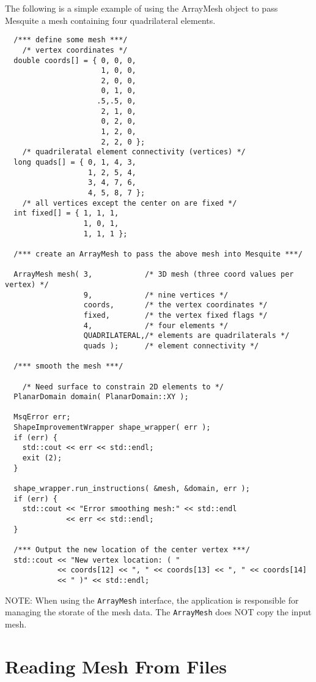 The following is a simple example of using the ArrayMesh object to pass
Mesquite a mesh containing four quadrilateral elements.
\begin{verbatim}
  /*** define some mesh ***/
    /* vertex coordinates */
  double coords[] = { 0, 0, 0,
                      1, 0, 0,
                      2, 0, 0,
                      0, 1, 0,
                     .5,.5, 0,
                      2, 1, 0,
                      0, 2, 0,
                      1, 2, 0,
                      2, 2, 0 };
    /* quadrileratal element connectivity (vertices) */
  long quads[] = { 0, 1, 4, 3,
                   1, 2, 5, 4,
                   3, 4, 7, 6,
                   4, 5, 8, 7 };
    /* all vertices except the center on are fixed */
  int fixed[] = { 1, 1, 1,
                  1, 0, 1,
                  1, 1, 1 };
  
  /*** create an ArrayMesh to pass the above mesh into Mesquite ***/
  
  ArrayMesh mesh( 3,            /* 3D mesh (three coord values per vertex) */
                  9,            /* nine vertices */
                  coords,       /* the vertex coordinates */ 
                  fixed,        /* the vertex fixed flags */
                  4,            /* four elements */
                  QUADRILATERAL,/* elements are quadrilaterals */
                  quads );      /* element connectivity */
  
  /*** smooth the mesh ***/
  
    /* Need surface to constrain 2D elements to */
  PlanarDomain domain( PlanarDomain::XY );

  MsqError err;
  ShapeImprovementWrapper shape_wrapper( err );
  if (err) {
    std::cout << err << std::endl;
    exit (2);
  }
  
  shape_wrapper.run_instructions( &mesh, &domain, err );
  if (err) {
    std::cout << "Error smoothing mesh:" << std::endl
              << err << std::endl;
  }
  
  /*** Output the new location of the center vertex ***/
  std::cout << "New vertex location: ( "
            << coords[12] << ", " << coords[13] << ", " << coords[14]
            << " )" << std::endl;
\end{verbatim}

NOTE:  When using the \texttt{ArrayMesh} interface, the application is responsible for managing the storate of the mesh data.  The \texttt{ArrayMesh}
 does NOT copy the input mesh.  

 
\section{Reading Mesh From Files} \label{sec:meshFiles}


